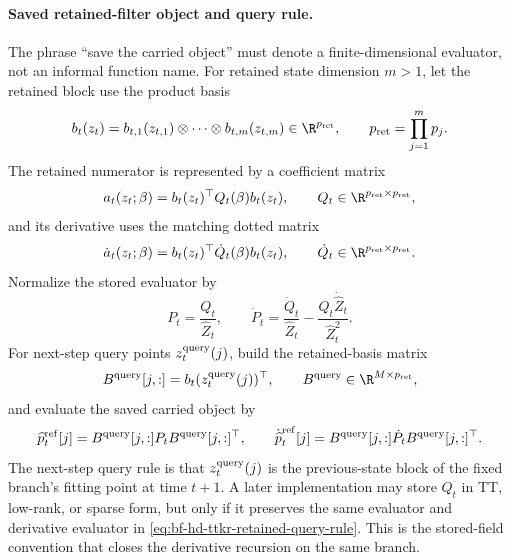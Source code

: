 \paragraph{Saved retained-filter object and query rule.}
The phrase “save the carried object” must denote a finite-dimensional evaluator,
not an informal function name.  For retained state dimension $m>1$, let the
retained block use the product basis
\begin{equation}
  b_t(z_t)=b_{t,1}(z_{t,1})\otimes\cdots\otimes b_{t,m}(z_{t,m})
  \in\R^{p_{\rm ret}},
  \qquad
  p_{\rm ret}=\prod_{j=1}^m p_j.
  \label{eq:bf-hd-ttkr-retained-product-basis}
\end{equation}
The retained numerator is represented by a coefficient matrix
\begin{equation}
  a_t(z_t;\beta)=b_t(z_t)^\top Q_t(\beta)b_t(z_t),
  \qquad
  Q_t\in\R^{p_{\rm ret}\times p_{\rm ret}},
  \label{eq:bf-hd-ttkr-retained-Q}
\end{equation}
and its derivative uses the matching dotted matrix
\begin{equation}
  \dot a_t(z_t;\beta)=b_t(z_t)^\top \dot Q_t(\beta)b_t(z_t),
  \qquad
  \dot Q_t\in\R^{p_{\rm ret}\times p_{\rm ret}}.
  \label{eq:bf-hd-ttkr-retained-dot-Q}
\end{equation}
Normalize the stored evaluator by
\begin{equation}
  P_t=\frac{Q_t}{\widehat Z_t},
  \qquad
  \dot P_t=
  \frac{\dot Q_t}{\widehat Z_t}
  -
  \frac{Q_t\dot{\widehat Z}_t}{\widehat Z_t^2}.
  \label{eq:bf-hd-ttkr-retained-P}
\end{equation}
For next-step query points $z_t^{\rm query}(j)$, build the retained-basis matrix
\begin{equation}
  B^{\rm query}[j,:]=b_t(z_t^{\rm query}(j))^\top,
  \qquad
  B^{\rm query}\in\R^{M\times p_{\rm ret}},
  \label{eq:bf-hd-ttkr-retained-query-basis}
\end{equation}
and evaluate the saved carried object by
\begin{equation}
  \widehat p_t^{\rm ref}[j]
  =
  B^{\rm query}[j,:]P_tB^{\rm query}[j,:]^\top,
  \qquad
  \dot{\widehat p}_t^{\rm ref}[j]
  =
  B^{\rm query}[j,:]\dot P_tB^{\rm query}[j,:]^\top.
  \label{eq:bf-hd-ttkr-retained-query-rule}
\end{equation}
The next-step query rule is that $z_t^{\rm query}(j)$ is the previous-state block
of the fixed branch's fitting point at time $t+1$.  A later implementation may
store $Q_t$ in TT, low-rank, or sparse form, but only if it preserves the same
evaluator and derivative evaluator in
\eqref{eq:bf-hd-ttkr-retained-query-rule}.  This is the stored-field convention
that closes the derivative recursion on the same branch.

